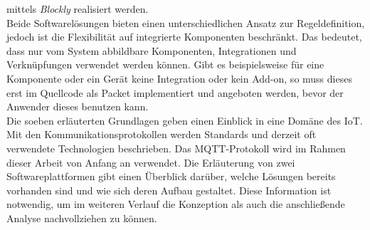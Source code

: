     mittels \textit{Blockly} realisiert werden. 
    \\
    Beide Softwarelösungen bieten einen unterschiedlichen Ansatz zur Regeldefinition, jedoch ist die Flexibilität 
    auf integrierte Komponenten beschränkt. Das bedeutet, dass nur vom System abbildbare Komponenten, 
    Integrationen und Verknüpfungen verwendet werden können. Gibt es beispielsweise für eine Komponente oder ein Gerät keine 
    Integration oder kein Add-on, so muss dieses erst im Quellcode als Packet implementiert und angeboten werden, bevor der 
    Anwender dieses benutzen kann. 
    \\
    \linebreak
    Die soeben erläuterten Grundlagen geben einen Einblick in eine Domäne des \acs{IoT}. Mit den Kommunikationsprotokollen werden Standards 
    und derzeit oft verwendete Technologien beschrieben. Das \acs{MQTT}-Protokoll wird im Rahmen dieser Arbeit von Anfang an verwendet. 
    Die Erläuterung von zwei Softwareplattformen gibt einen Überblick 
    darüber, welche Lösungen bereits vorhanden sind und wie sich deren Aufbau gestaltet. Diese Information ist notwendig, um im 
    weiteren Verlauf die Konzeption als auch die anschließende Analyse nachvollziehen zu können.

 